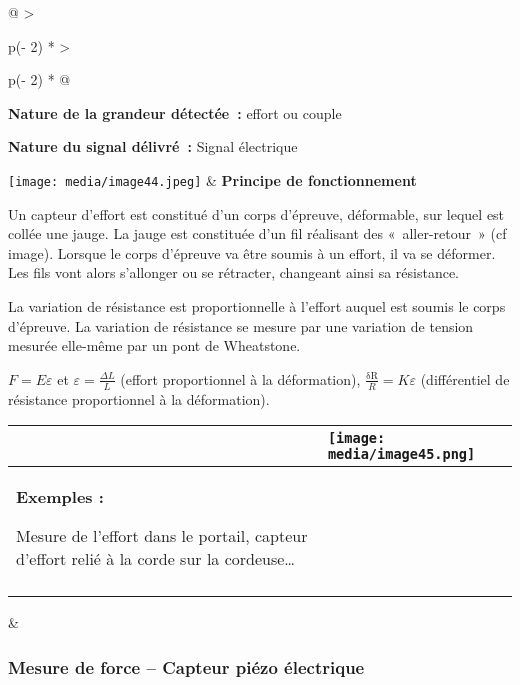 \documentclass[
]{article}
\begin{document}
\begin{longtable}[]{@{}
  >{\raggedright\arraybackslash}p{(\columnwidth - 2\tabcolsep) * }
  >{\raggedright\arraybackslash}p{(\columnwidth - 2\tabcolsep) * }@{}}
\toprule
\textbf{Nature de la grandeur détectée~:} effort ou couple

\textbf{Nature du signal délivré~:} Signal électrique

\texttt{[image: media/image44.jpeg]} &
\textbf{Principe de fonctionnement}

Un capteur d'effort est constitué d'un corps d'épreuve, déformable, sur
lequel est collée une jauge. La jauge est constituée d'un fil réalisant
des «~aller-retour~» (cf image). Lorsque le corps d'épreuve va être
soumis à un effort, il va se déformer. Les fils vont alors s'allonger ou
se rétracter, changeant ainsi sa résistance.

La variation de résistance est proportionnelle à l'effort auquel est
soumis le corps d'épreuve. La variation de résistance se mesure par une
variation de tension mesurée elle-même par un pont de Wheatstone.

\(F = E\varepsilon\) et \(\varepsilon = \frac{\Delta L}{L}\) (effort
proportionnel à la déformation), \(\frac{\text{δR}}{R} = K\varepsilon\)
(différentiel de résistance proportionnel à la déformation). \\
\midrule
\endhead
\begin{minipage}[t]{\linewidth}\raggedright
\begin{longtable}[]{@{}
  >{\raggedright\arraybackslash}p{}
  >{\raggedright\arraybackslash}p{}@{}}
\toprule
&
\texttt{[image: media/image45.png]} \\
\midrule
\endhead
\textbf{Exemples :}

Mesure de l'effort dans le portail, capteur d'effort relié à la corde
sur la cordeuse\ldots{} & \\
& \\
\bottomrule
\end{longtable}
\end{minipage} & \\
\bottomrule
\end{longtable}

\hypertarget{mesure-de-force-capteur-piuxe9zo-uxe9lectrique}{%
\subsubsection{Mesure de force -- Capteur piézo
électrique}\label{mesure-de-force-capteur-piuxe9zo-uxe9lectrique}}
\end{document}

